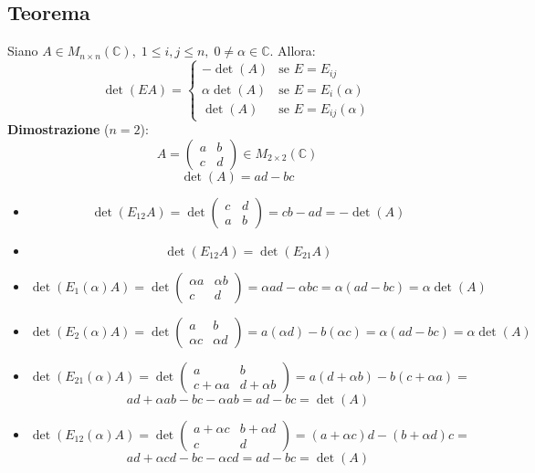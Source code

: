 \documentclass[a4paper]{article}
\theoremstyle{break}
\theoremstyle{break}
\theoremstyle{break}
\theoremstyle{break}
\begin{document}
\subsection{Teorema}
Siano \( A \in M_{n \times n}(\mathbb{C}),\; 1 \le i,j \le n,\; 0 \neq \alpha \in \mathbb{C} \).
Allora:
\[
\det(EA) = \begin{cases}
  -\det(A) & \text{se } E = E_{ij}\\
  \alpha \det(A) & \text{se } E = E_i(\alpha)\\
  \det(A) & \text{se } E = E_{ij}(\alpha)
\end{cases}
\] 
\textbf{Dimostrazione} (\( n=2 \)):
\[
A = \begin{pmatrix} 
  a & b\\
  c & d
\end{pmatrix} 
\in  M_{2 \times 2}(\mathbb{C})
\] 
\[
\det(A) = ad-bc
\] 
\begin{itemize}
  \item 
    \[
      \det(E_{12}A) = \det \begin{pmatrix} 
        c & d\\
        a & b
      \end{pmatrix}
      = cb - ad = -\det(A)
    \] 
  \item 
    \[
      \det(E_{12}A) = \det(E_{21}A)
    \] 
    \item
      \[
        \det(E_1(\alpha)A) = \det \begin{pmatrix} 
          \alpha a & \alpha b\\
          c & d
        \end{pmatrix}
        = \alpha ad - \alpha bc = \alpha(ad-bc) = \alpha \det(A)
      \] 
      \item
        \[
          \det(E_2(\alpha)A) = \det \begin{pmatrix} 
            a & b\\
            \alpha c & \alpha d
          \end{pmatrix}
          = a(\alpha d) - b(\alpha c) = \alpha(ad-bc) = \alpha \det(A)
        \] 
      \item 
        \[
          \det(E_{21}(\alpha)A) = \det \begin{pmatrix} 
            a & b\\
            c+\alpha a & d+\alpha b
          \end{pmatrix} 
          = a(d+\alpha b) - b(c+\alpha a) = 
        \] 
        \[
          ad + \alpha ab - bc - \alpha ab = ad-bc = \det(A)
        \] 
      \item
        \[
          \det(E_{12}(\alpha)A) = \det \begin{pmatrix} 
            a+\alpha c & b+\alpha d\\
            c & d
          \end{pmatrix}
          = (a+\alpha c)d - (b+\alpha d)c = 
        \] 
        \[
          ad + \alpha cd - bc - \alpha cd =  ad-bc = \det(A)
        \] 
\end{itemize}
\end{document}
